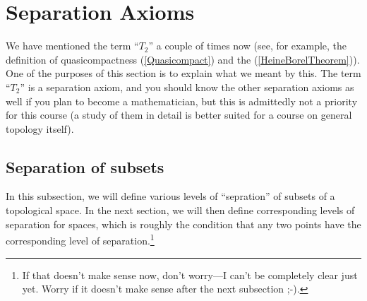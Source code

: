 \section{Separation Axioms}\label{sct4.5}

We have mentioned the term ``$T_2$'' a couple of times now (see, for example, the definition of quasicompactness (\cref{Quasicompact}) and the  (\cref{HeineBorelTheorem})).  One of the purposes of this section is to explain what we meant by this.  The term ``$T_2$'' is a separation axiom, and you should know the other separation axioms as well if you plan to become a mathematician, but this is admittedly not a priority for this course (a study of them in detail is better suited for a course on general topology itself).

\subsection{Separation of subsets}

In this subsection, we will define various levels of ``sepration'' of subsets of a topological space.  In the next section, we will then define corresponding levels of separation for spaces, which is roughly the condition that any two points have the corresponding level of separation.\footnote{If that doesn't make sense now, don't worry---I can't be completely clear just yet.  Worry if it doesn't make sense after the next subsection ;-).}

